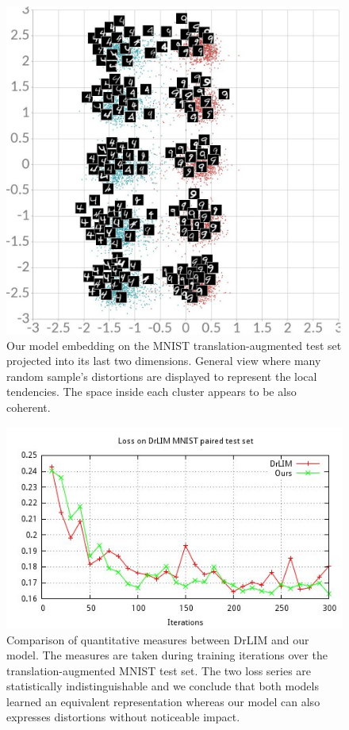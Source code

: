 \documentclass[a4paper,12pt]{report}
\begin{document}
\begin{figure}
    \centering
    \includegraphics[width=\textwidth]{thesis_figures/mnist_cl2d2.jpg}
    \caption{Our model embedding on the MNIST translation-augmented test set projected into its last two dimensions.
    General view where many random sample's distortions are displayed to represent the local tendencies.
    The space inside each cluster appears to be also coherent.
    }
    \label{fig:mnist_cl2d_2}
\end{figure}

\begin{figure}[h]
    \begin{center}
        \includegraphics{thesis_figures/final_loss_test2bv7.jpg}
    \end{center}
    \caption{Comparison of quantitative measures between DrLIM and our model.
    The measures are taken during training iterations over the translation-augmented MNIST test set.
    The two loss series are statistically indistinguishable and we conclude that both models learned an equivalent representation whereas our model can also expresses distortions without noticeable impact.
    }
    \label{fig:loss_mnist_test_common}
\end{figure}
\end{document}
